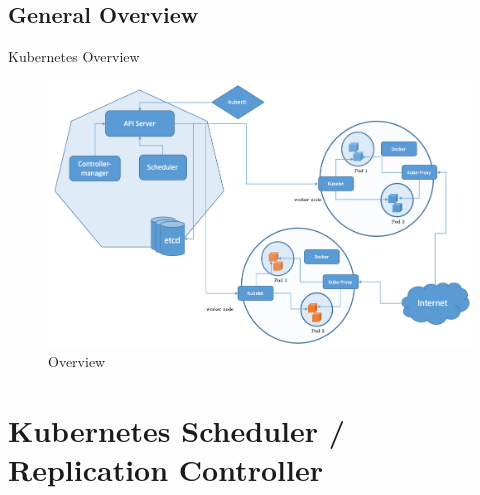 \documentclass{bredelebeamer}
\begin{document}
\subsection{General Overview}
\begin{frame}{Kubernetes Overview}
\begin{figure}
\centering
\includegraphics[scale=0.37]{images/img24.png}
\caption{Overview}
\end{figure}
\end{frame}



\section{Kubernetes Scheduler / Replication Controller}
\end{document}
